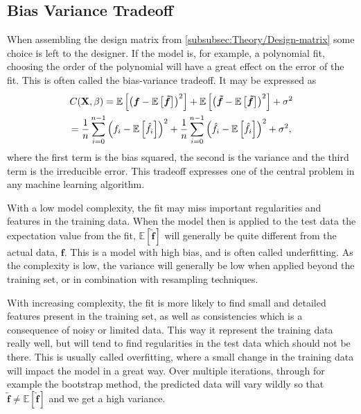 \documentclass[10pt, twocolumn]{article}
\providecommand{\forv}[1]
{
\ensuremath{\mathbb{E}\left[#1\right]}
}
\providecommand{\forvsum}[1]
{
\ensuremath{\frac{1}{n}\sum_{i=0}^{n-1} #1}
}
\providecommand{\bmt}[1]
{
\ensuremath{\bm{\tilde{#1}}}
}
\begin{document}
\subsection{Bias Variance Tradeoff}
\label{subsec:Theory/Bias_variance_tradeoff}
When assembling the design matrix from \cref{subsubsec:Theory/Design-matrix} some choice is left to the designer. If the model is, for example, a polynomial fit, choosing the order of the polynomial will have a great effect on the error of the fit. This is often called the bias-variance tradeoff. It may be expressed as
\begin{gather}
    C(\vb{X},\beta) = \forv{\left(\bm{f}-\forv{\bmt{f}}\right)^2} + \forv{\left(\bmt{f}-\forv{\bmt{f}}\right)^2} + \sigma^2 \notag
    \\
    = \forvsum{\left(f_i-\forv{\hat{f}_i}\right)^2} + \forvsum{\left(\hat{f}_i-\forv{\hat{f}_i}\right)^2} + \sigma^2, \label{eq:Bias_variance_tradeoff}
\end{gather}
where the first term is the bias squared, the second is the variance and the third term is the irreducible error. This tradeoff expresses one of the central problem in any machine learning algorithm.

With a low model complexity, the fit may miss important regularities and features in the training data. When the model then is applied to the test data the expectation value from the fit, $\forv{\bmt{f}}$ will generally be quite different from the actual data, $\bm{f}$. This is a model with high bias, and is often called underfitting. As the complexity is low, the variance will generally be low when applied beyond the training set, or in combination with resampling techniques.

With increasing complexity, the fit is more likely to find small and detailed features present in the training set, as well as consistencies which is a consequence of noisy or limited data. This way it represent the training data really well, but will tend to find regularities in the test data which should not be there. This is usually called overfitting, where a small change in the training data will impact the model in a great way. Over multiple iterations, through for example the bootstrap method, the predicted data will vary wildly so that $\bmt{f} \neq \forv{\bmt{f}}$ and we get a high variance.


\end{document}
